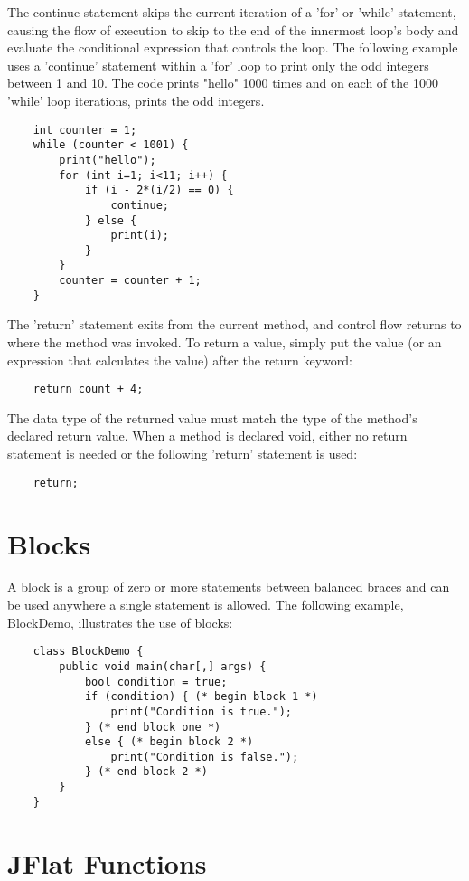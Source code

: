 \begin{homeworkProblem}
	The continue statement skips the current iteration of a 'for' or 'while' statement, causing the flow of execution to skip to the end of the innermost loop's body and evaluate the conditional expression that controls the loop.
	The following example uses a 'continue' statement within a 'for' loop to print only the odd integers between 1 and 10. The code prints "hello" 1000 times and on each of the 1000 'while' loop iterations, prints the odd integers.
	
	\begin{verbatim} 
	int counter = 1;
	while (counter < 1001) {
		print("hello");
		for (int i=1; i<11; i++) {
			if (i - 2*(i/2) == 0) {
				continue;
			} else {
				print(i);
			}
		}
		counter = counter + 1;
	}
	\end{verbatim}
	
	
	The 'return' statement exits from the current method, and control flow returns to where the method was invoked. To return a value, simply put the value (or an expression that calculates the value) after the return keyword:
	\begin{verbatim} 
	return count + 4;
	\end{verbatim}
	
	The data type of the returned value must match the type of the method's declared return value. When a method is declared void, either no return statement is needed or the following 'return' statement is used:
	
	\begin{verbatim} 
	return;
	\end{verbatim}
	
	\section{Blocks}
	
	A block is a group of zero or more statements between balanced braces and can be used anywhere a single statement is allowed. The following example, BlockDemo, illustrates the use of blocks:
	
	\begin{verbatim} 
	class BlockDemo {
		public void main(char[,] args) {
			bool condition = true;
			if (condition) { (* begin block 1 *)
				print("Condition is true.");
			} (* end block one *)
			else { (* begin block 2 *)
				print("Condition is false.");
			} (* end block 2 *)
		}
	}
	\end{verbatim}
	
	\section{JFlat Functions}
	

\end{homeworkProblem}
